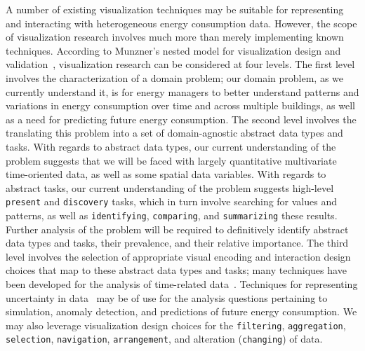 A number of existing visualization techniques may be suitable for representing and interacting with heterogeneous energy consumption data. 
However, the scope of visualization research involves much more than merely implementing known techniques. 
According to Munzner's nested model for visualization design and validation~\cite{Munzner2009}, visualization research can be considered at four levels. 
The first level involves the characterization of a domain problem; our domain problem, as we currently understand it, is for energy managers to better understand patterns and variations in energy consumption over time and across multiple buildings, as well as a need for predicting future energy consumption. 
The second level involves the translating this problem into a set of domain-agnostic abstract data types and tasks. 
With regards to abstract data types, our current understanding of the problem suggests that we will be faced with largely quantitative multivariate time-oriented data, as well as some spatial data variables. 
With regards to abstract tasks, our current understanding of the problem suggests high-level {\tt present} and {\tt discovery} tasks, which in turn involve searching for values and patterns, as well as {\tt identifying}, {\tt comparing}, and {\tt summarizing} these results. 
Further analysis of the problem will be required to definitively identify abstract data types and tasks, their prevalence, and their relative importance. 
The third level involves the selection of appropriate visual encoding and interaction design choices that map to these abstract data types and tasks; many techniques have been developed for the analysis of time-related data~\cite{Aigner2011}. 
Techniques for representing uncertainty in data~\cite{MacEachren2012} may be of use for the analysis questions pertaining to simulation, anomaly detection, and predictions of future energy consumption. 
We may also leverage visualization design choices for the {\tt filtering}, {\tt aggregation}, {\tt selection}, {\tt navigation}, {\tt arrangement}, and alteration ({\tt changing}) of data. 
